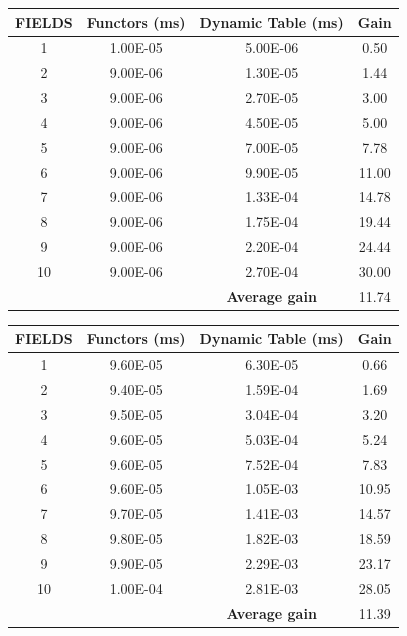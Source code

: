 \begin{table}
	\centering
	\begin{tabular}{|c|c|c|c|}
		\hline
		\textbf{FIELDS}& \textbf{Functors (ms)}&\textbf{Dynamic Table (ms)} & \textbf{Gain}\\ \hline
		1&	1.00E-05&	5.00E-06&	0.50\\ \hline
		2&	9.00E-06&	1.30E-05&	1.44\\ \hline
		3&	9.00E-06&	2.70E-05&	3.00\\ \hline
		4&	9.00E-06&	4.50E-05&	5.00\\ \hline
		5&	9.00E-06&	7.00E-05&	7.78\\ \hline
		6&	9.00E-06&	9.90E-05&	11.00\\ \hline
		7&	9.00E-06&	1.33E-04&	14.78\\ \hline
		8&	9.00E-06&	1.75E-04&	19.44\\ \hline
		9&	9.00E-06&	2.20E-04&	24.44\\ \hline
		10&	9.00E-06&	2.70E-04&	30.00\\ \hline
		\multicolumn{2}{c|}{} & \textbf{Average gain} & 11.74\\ \cline{3-4}			
	\end{tabular}
	
	\vspace{0.15cm}
	\begin{tabular}{|c|c|c|c|}
		\hline
		\textbf{FIELDS}& \textbf{Functors (ms)}&\textbf{Dynamic Table (ms)} & \textbf{Gain}\\ \hline
		1&	9.60E-05&	6.30E-05&	0.66\\ \hline
		2&	9.40E-05&	1.59E-04&	1.69\\ \hline
		3&	9.50E-05&	3.04E-04&	3.20\\ \hline
		4&	9.60E-05&	5.03E-04&	5.24\\ \hline
		5&	9.60E-05&	7.52E-04&	7.83\\ \hline
		6&	9.60E-05&	1.05E-03&	10.95\\ \hline
		7&	9.70E-05&	1.41E-03&	14.57\\ \hline
		8&	9.80E-05&	1.82E-03&	18.59\\ \hline
		9&	9.90E-05&	2.29E-03&	23.17\\ \hline
		10&	1.00E-04&	2.81E-03&	28.05\\ \hline
		\multicolumn{2}{c|}{} & \textbf{Average gain} & 11.39\\ \cline{3-4}						
	\end{tabular}
	

\end{table}
